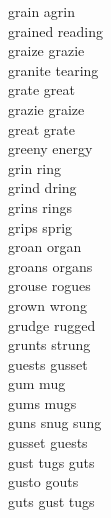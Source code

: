 grain agrin\\
grained reading\\
graize grazie\\
granite tearing\\
grate great\\
grazie graize\\
great grate\\
greeny energy\\
grin ring\\
grind dring\\
grins rings\\
grips sprig\\
groan organ\\
groans organs\\
grouse rogues\\
grown wrong\\
grudge rugged\\
grunts strung\\
guests gusset\\
gum mug\\
gums mugs\\
guns snug sung\\
gusset guests\\
gust tugs guts\\
gusto gouts\\
guts gust tugs\\

